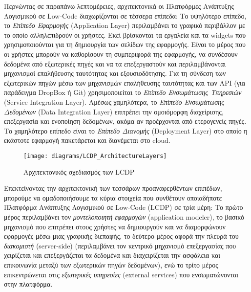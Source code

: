            Περνώντας σε παραπάνω λεπτομέρειες, αρχιτεκτονικά οι Πλατφόρμες Ανάπτυξης Λογισμικού σε Low-Code διαχωρίζονται σε τέσσερα επίπεδα: Το υψηλότερο επίπεδο, το \textit{Επίπεδο Εφαρμογής} (Application Layer) περιλαμβάνει το γραφικό περιβάλλον με το οποίο αλληλεπιδρούν οι χρήστες. Εκεί βρίσκονται τα εργαλεία και τα widgets που χρησιμοποιούνται για τη δημιουργία των σελίδων της εφαρμογής. Είναι το μέρος που οι χρήστες μπορούν να καθορίσουν τη συμπεριφορά της εφαρμογής, να συνδέσουν δεδομένα από εξωτερικές πηγές και να τα επεξεργαστούν και περιλαμβάνονται μηχανισμοί επαλήθευσης ταυτότητας και εξουσιοδότησης. Για τη σύνδεση των εξωτερικών πηγών μέσω των μηχανισμών επαλήθευσης ταυτότητας και των API (για παράδειγμα DropBox ή Git) χρησιμοποιείται το \textit{Επίπεδο Ενσωμάτωσης Υπηρεσιών} (Service Integration Layer). Αμέσως χαμηλότερα, το \textit{Επίπεδο Ενσωμάτωσης Δεδομένων} (Data Integration Layer) επιτρέπει την ομοιόμορφη διαχείρισης, επεξεργασία και ενοποίηση δεδομένων, ακόμα αν προέρχονται από ετερογενείς πηγές. Το χαμηλότερο επίπεδο είναι το \textit{Επίπεδο Διανομής} (Deployment Layer) στο οποίο η εκάστοτε εφαρμογή πακετάρεται και διανέμεται στο cloud. \cite{Sahay2020}

            \begin{figure}[h!] \noindent \centering
                    \texttt{[image: diagrams/LCDP\_ArchitectureLayers]}
                    \caption{Αρχιτεκτονικός σχεδιασμός των LCDP \cite{Sahay2020}}
            \end{figure}

            Επεκτείνοντας την αρχιτεκτονική των τεσσάρων προαναφερθέντων επιπέδων, μπορούμε να ομαδοποιήσουμε τα κύρια στοιχεία που συνθέτουν οποιαδήποτε Πλατφόρμα Ανάπτυξης Λογισμικού σε Low-Code (LCDP) σε τρία μέρη: Το πρώτο μέρος περιλαμβάνει τον \textit{μοντελοποιητή εφαρμογών} (application modeler), το βασικό μηχανισμό που επιτρέπει στους χρήστες να δημιουργούν και να διαμορφώνουν εφαρμογές μέσω μιας γραφικής διεπαφής, το δεύτερο μέρος αφορά την πλευρά του \textit{διακομιστή} (server-side) (περιλαμβάνει τον κεντρικό μηχανισμό επεξεργασίας που χειρίζεται και επεξεργάζεται τα δεδομένα και διαχειρίζεται την ασφάλεια και επικοινωνία μεταξύ των εξωτερικών πηγών δεδομένων), ενώ το τρίτο μέρος επικεντρώνεται στις \textit{εξωτερικές υπηρεσίες} (external services) που ενσωματώνονται στην πλατφόρμα.

